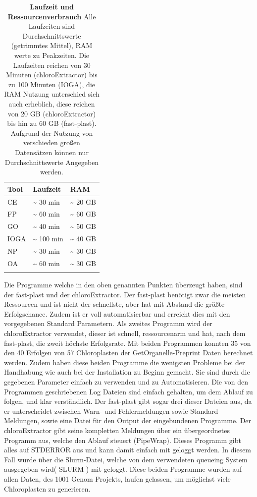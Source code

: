 \documentclass{scrartcl}
\begin{document}
\begin{table}[!h]
\caption[Laufzeit und Ressourcenverbrauch]{\textbf{Laufzeit und Ressourcenverbrauch} Alle Laufzeiten sind Durchschnittswerte (getrimmtes Mittel), RAM werte zu Peakzeiten. Die Laufzeiten reichen von 30 Minuten (chloroExtractor) bis zu 100 Minuten (IOGA), die RAM Nutzung unterschied sich auch erheblich, diese reichen von 20 GB (chloroExtractor) bis hin zu 60 GB (fast-plast). Aufgrund der Nutzung von verschieden großen Datensätzen können nur Durchschnittswerte Angegeben werden.}
\begin{center}
\begin{tabular}{lll}
Tool & Laufzeit & RAM\\
\hline
CE & \textasciitilde{}  30 min & \textasciitilde{} 20 GB\\
FP & \textasciitilde{}  60 min & \textasciitilde{} 60 GB\\
GO & \textasciitilde{}  40 min & \textasciitilde{} 50 GB\\
IOGA & \textasciitilde{} 100 min & \textasciitilde{} 40 GB\\
NP & \textasciitilde{}  30 min & \textasciitilde{} 30 GB\\
OA & \textasciitilde{}  60 min & \textasciitilde{} 30 GB\\
 &  & \\
\end{tabular}
\end{center}
\end{table}
Die Programme welche in den oben genannten Punkten überzeugt haben, sind der fast-plast und der chloroExtractor. Der fast-plast benötigt zwar die 
meisten Ressourcen und ist nicht der schnellste, aber hat mit Abstand die größte Erfolgschance. Zudem ist er voll automatisierbar und erreicht 
dies mit den vorgegebenen Standard Parametern. Als zweites Programm wird der chloroExtractor verwendet, dieser ist schnell, ressourcenarm und hat, nach dem
fast-plast, die zweit höchste Erfolgsrate. Mit beiden Programmen konnten 35 von den 40 Erfolgen von 57 Chloroplasten der GetOrganelle-Preprint Daten berechnet werden.
Zudem haben diese beiden Programme die wenigsten
Probleme bei der Handhabung wie auch bei der Installation zu Beginn gemacht. Sie sind durch die gegebenen Parameter einfach zu verwenden und zu Automatisieren.
Die von den Programmen geschriebenen Log Dateien sind einfach gehalten, um dem Ablauf zu folgen, und klar verständlich. Der fast-plast gibt sogar drei dieser
Dateien aus, da er unterscheidet zwischen Warn- und Fehlermeldungen sowie Standard Meldungen, sowie eine Datei für den Output der eingebundenen Programme. 
Der chloroExtractor gibt seine kompletten Meldungen über ein übergeordnetes Programm aus, welche den Ablauf steuert (PipeWrap). Dieses Programm gibt alles auf STDERROR aus und 
kann damit einfach mit geloggt werden. In diesem Fall wurde über die Slurm-Datei, welche von dem verwendeten queueing System ausgegeben wird( SLURM \footnotemark[19]{}) mit geloggt. 
Diese beiden Programme wurden auf allen Daten, des 1001 Genom Projekts, laufen gelassen, um möglichst viele Chloroplasten zu generieren. 
\end{document}
